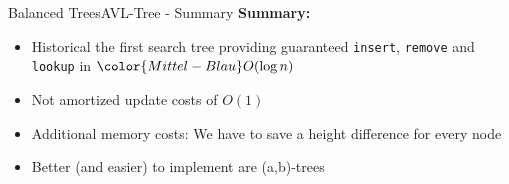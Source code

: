 \begin{frame}{Balanced Trees}{AVL-Tree - Summary}
  \textbf{Summary:}
  \begin{itemize}
    \item<2->
      Historical the first search tree providing guaranteed
      \texttt{\color{Mittel-Blau}insert}, \texttt{\color{Mittel-Blau}remove}
      and \texttt{\color{Mittel-Blau}lookup} in
      ${\color{Mittel-Blau}O(\log n)}$
    \item<3->
      Not amortized update costs of {\color{Mittel-Blau}$O(1)$}
    \item<4->
      Additional memory costs:
      We have to save a height difference for every node
    \item<5->
      Better (and easier) to implement are {\color{Mittel-Blau}(a,b)}-trees
  \end{itemize}
\end{frame}
